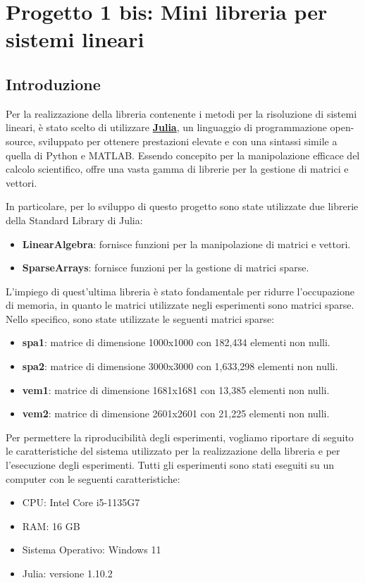 \chapter{Progetto 1 bis: Mini libreria per sistemi lineari}
\section{Introduzione}\label{sec:intro}
Per la realizzazione della libreria contenente i metodi per la risoluzione di
sistemi lineari, è stato scelto di utilizzare \href{https://julialang.org/}{\textbf{Julia}},
un linguaggio di programmazione open-source, sviluppato per ottenere prestazioni
elevate e con una sintassi simile a quella di Python e MATLAB. Essendo concepito
per la manipolazione efficace del calcolo scientifico, offre una vasta gamma di
librerie per la gestione di matrici e vettori.

In particolare, per lo sviluppo di questo progetto sono state utilizzate due
librerie della Standard Library di Julia:
\begin{itemize}
    \item \textbf{LinearAlgebra}: fornisce funzioni per la manipolazione di
          matrici e vettori.
    \item \textbf{SparseArrays}: fornisce funzioni per la gestione di matrici sparse.
\end{itemize}

L'impiego di quest'ultima libreria è stato fondamentale per ridurre l'occupazione
di memoria, in quanto le matrici utilizzate negli esperimenti sono matrici sparse.
Nello specifico, sono state utilizzate le seguenti matrici sparse:
\begin{itemize}
    \item \textbf{spa1}: matrice di dimensione 1000x1000 con 182,434 elementi non nulli.
    \item \textbf{spa2}: matrice di dimensione 3000x3000 con 1,633,298 elementi non nulli.
    \item \textbf{vem1}: matrice di dimensione 1681x1681 con 13,385 elementi non nulli.
    \item \textbf{vem2}: matrice di dimensione 2601x2601 con 21,225 elementi non nulli.
\end{itemize}

Per permettere la riproducibilità degli esperimenti, vogliamo riportare di seguito
le caratteristiche del sistema utilizzato per la realizzazione della libreria e
per l'esecuzione degli esperimenti. Tutti gli esperimenti sono stati eseguiti su
un computer con le seguenti caratteristiche:
\begin{itemize}
    \item CPU: Intel Core i5-1135G7
    \item RAM: 16 GB
    \item Sistema Operativo: Windows 11
    \item Julia: versione 1.10.2
\end{itemize}
